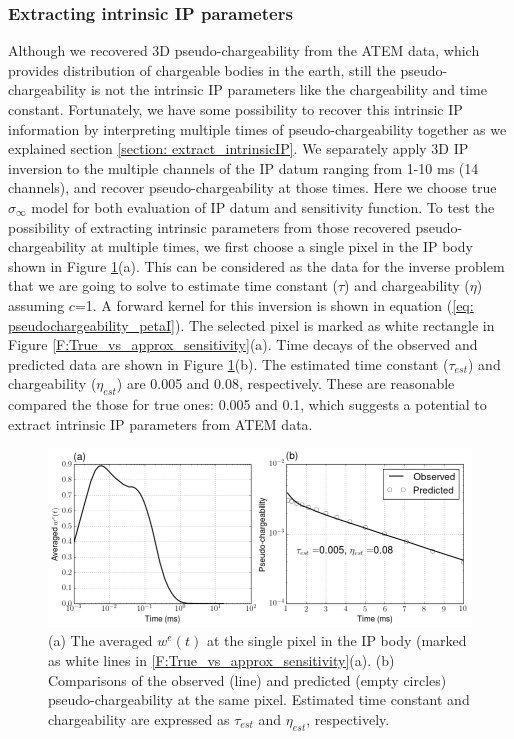 \documentclass[a4paper, 11pt]{article}
\newcommand{\siginf}{\sigma_\infty}
\begin{document}
\subsubsection{Extracting intrinsic IP parameters}
Although we recovered 3D pseudo-chargeability from the ATEM data, which provides distribution of chargeable bodies in the earth, still the pseudo-chargeability is not the intrinsic IP  parameters like the chargeability and time constant.
Fortunately, we have some possibility to recover this intrinsic IP information by interpreting multiple times of pseudo-chargeability together as we explained section \ref{section: extract_intrinsicIP}. 
We separately apply 3D IP inversion to the multiple channels of the IP datum ranging from 1-10 ms (14 channels), and recover pseudo-chargeability at those times. 
Here we choose true $\siginf$ model for both evaluation of IP datum and sensitivity function. 
To test the possibility of extracting intrinsic parameters from those recovered pseudo-chargeability at multiple times, we first choose a single pixel in the IP body shown in Figure \ref{F:IntrinsicIP}(a).  
This can be considered as the data for the inverse problem that we are going to solve to  estimate time constant ($\tau$) and chargeability ($\eta$) assuming $c$=1. 
A forward kernel for this inversion is shown in equation (\ref{eq: pseudochargeability_petaI}). 
The selected pixel is marked as white rectangle in Figure \ref{F:True_vs_approx_sensitivity}(a).  
Time decays of the observed and predicted data are shown in Figure \ref{F:IntrinsicIP}(b).
The estimated time constant ($\tau_{est}$) and chargeability ($\eta_{est}$) are 0.005 and 0.08, respectively. 
These are reasonable compared the those for true ones: 0.005 and 0.1, which suggests a potential to extract intrinsic IP parameters from ATEM data. 

\begin{figure}[htb]
  \centering
  \includegraphics[width=1.\textwidth]{figures/IntrinsicIP.png}
  \caption{(a) The averaged $w^e(t)$ at the single pixel in the IP body (marked as white lines in \ref{F:True_vs_approx_sensitivity}(a). 
  (b) Comparisons of the observed (line) and predicted (empty circles) pseudo-chargeability at the same pixel. Estimated time constant and chargeability are expressed as $\tau_{est}$ and $\eta_{est}$, respectively.}
  \label{F:IntrinsicIP}
\end{figure}
\clearpage
\end{document}
